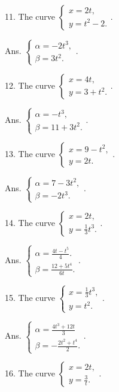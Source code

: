 11. The curve 	
$\begin{cases} x = 2t, \\ 
y = t^2 - 2. \end{cases}$.

Ans. $\begin{cases} \alpha = -2 t^3, \\ 
\beta = 3t^2. \end{cases}$.

12. The curve 	
$\begin{cases} x = 4t, \\ 
y = 3 + t^2. \end{cases}$.

Ans. $\begin{cases} \alpha = -t^3, \\ 
\beta = 11 + 3t^2. \end{cases}$.

13. The curve 	
$\begin{cases} x = 9 - t^2, \\ 
y = 2t. \end{cases}$.

Ans. $\begin{cases} \alpha = 7 - 3t^2, \\
\beta = -2t^3. \end{cases}$.

14. The curve 	
$\begin{cases} x = 2t, \\ 
y = \frac{1}{3}t^3. \end{cases}$.

Ans. $\begin{cases} \alpha = \frac{4t - t^5}{4}. \\ 
\beta = \frac{12 + 5t^4}{6t}. \end{cases}$.

15. The curve 	
$\begin{cases} x = \frac{1}{3} t^3, \\ 
y = t^2. \end{cases}$.

Ans. $\begin{cases} \alpha = \frac{4t^3 + 12t}{3} \\ 
\beta = -\frac{2t^2 + t^4}{2}. \end{cases}$.

16. The curve 	
$\begin{cases} x = 2t, \\ 
y = \frac{3}{t}. \end{cases}$.

